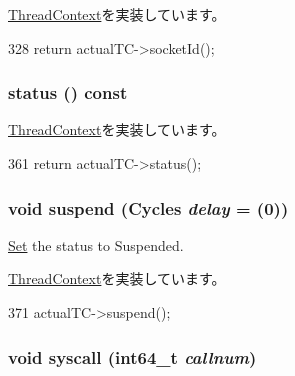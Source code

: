 \hyperlink{classThreadContext_aba2c497e8af03f742e5ece80efaeb197}{ThreadContext}を実装しています。


\begin{DoxyCode}
328 { return actualTC->socketId(); }
\end{DoxyCode}
\hypertarget{classProxyThreadContext_a2ad9e92a82d6f783b3061584729c2f4a}{
\subsubsection[{status}]{ status () const}}
\label{classProxyThreadContext_a2ad9e92a82d6f783b3061584729c2f4a}


\hyperlink{classThreadContext_adfba9b39542cba955a02b8ff3ba023a9}{ThreadContext}を実装しています。


\begin{DoxyCode}
361 { return actualTC->status(); }
\end{DoxyCode}
\hypertarget{classProxyThreadContext_a32072550286c5735b4b95349efa8e4f6}{
\subsubsection[{suspend}]{\setlength{\rightskip}{0pt plus 5cm}void suspend ({\bf Cycles} {\em delay} = {(0)})}}
\label{classProxyThreadContext_a32072550286c5735b4b95349efa8e4f6}


\hyperlink{classSet}{Set} the status to Suspended. 

\hyperlink{classThreadContext_af2ae27d19d77b0301484ac488d97d37b}{ThreadContext}を実装しています。


\begin{DoxyCode}
371 { actualTC->suspend(); }
\end{DoxyCode}
\hypertarget{classProxyThreadContext_a36e0b96120fcbbc2ee8699158f7be5c2}{
\subsubsection[{syscall}]{\setlength{\rightskip}{0pt plus 5cm}void syscall (int64\_\-t {\em callnum})}}
\label{classProxyThreadContext_a36e0b96120fcbbc2ee8699158f7be5c2}


